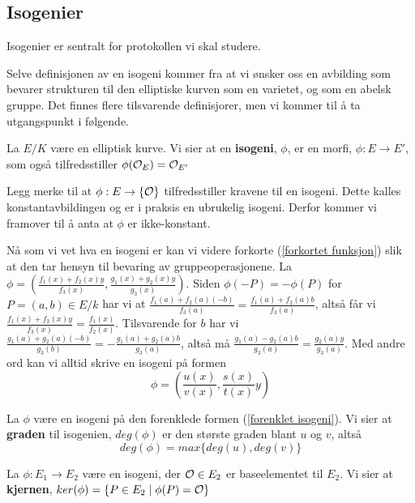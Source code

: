 \subsection{Isogenier}
Isogenier er sentralt for protokollen vi skal studere. 

Selve definisjonen av en isogeni kommer fra at vi ønsker oss en avbilding som bevarer strukturen til den elliptiske kurven som en varietet, og som en abelsk gruppe. Det finnes flere tilsvarende definisjorer, men vi kommer til å ta utgangspunkt i følgende.
\begin{definisjon}
La $E/K$ være en elliptisk kurve. Vi sier at en \textbf{isogeni}, $\phi$, er en morfi, $\phi: E \rightarrow E'$, som også tilfredsstiller $\phi(\mathcal{O}_E) = \mathcal{O}_{E'}$
\end{definisjon}

Legg merke til at $\phi: E \rightarrow \{\mathcal{O} \}$ tilfredsstiller kravene til en isogeni. Dette kalles konstantavbildingen og er i praksis en ubrukelig isogeni. Derfor kommer vi framover til å anta at $\phi$ er ikke-konstant.

Nå som vi vet hva en isogeni er kan vi videre forkorte (\ref{forkortet funksjon}) slik at den tar hensyn til bevaring av gruppeoperasjonene. La $\phi = (\frac{f_1(x) + f_2(x)y}{f_3(x)}, \frac{g_1(x) + g_2(x)y}{g_3(x)})$. Siden $\phi(-P) = -\phi(P)$ for $P = (a,b) \in E/k$ har vi at $\frac{f_1(a) + f_2(a)(-b)}{f_3(a)} = \frac{f_1(a) + f_2(a)b}{f_3(a)}$, altså får vi $\frac{f_1(x) + f_2(x)y}{f_3(x)} = \frac{f_1(x)}{f_2(x)}$. Tilsvarende for $b$ har vi $\frac{g_1(a) + g_2(a)(-b)}{g_3(b)} = -\frac{g_1(a) + g_2(a)b}{g_3(a)}$, altså må $\frac{g_1(a) - g_2(a)b}{g_3(a)} = \frac{g_2(a)y}{g_3(a)}$. Med andre ord kan vi alltid skrive en isogeni på formen 
\begin{equation}
\label{forenklet isogeni}
\phi = (\frac{u(x)}{v(x)}, \frac{s(x)}{t(x)}y)
\end{equation}

\begin{definisjon}
La $\phi$ være en isogeni på den forenklede formen (\ref{forenklet isogeni}). Vi sier at \textbf{graden} til isogenien, $deg(\phi)$ er den største graden blant $u$ og $v$, altså $$deg(\phi) = max \{deg(u), deg(v) \} $$
\end{definisjon}

\begin{definisjon}
La $\phi: E_1 \rightarrow E_2$ være en isogeni, der $\mathcal{O} \in E_2$  er baseelementet til $E_2$. Vi sier at \textbf{kjernen}, $ker(\phi) = \{P \in E_2 \mid \phi(P) = \mathcal{O}\}$
\end{definisjon}

